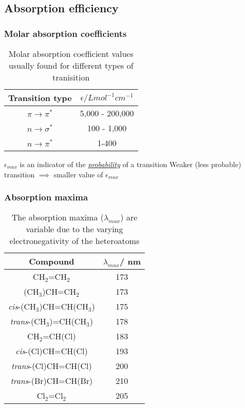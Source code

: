 \documentclass[ignorenonframetext]{beamer}
\begin{document}
\subsection{Absorption efficiency}

\begin{frame}[label=molabs]
\frametitle{Molar absorption coefficients}
\begin{table}[h!]
\caption{Molar absorption coefficient values usually found for different types of tranisition}
\begin{tabular}{c c}
	\textbf{Transition type} & \textbf{\(\epsilon/L mol^{-1}cm^{-1}\)}\\\hline
	\(\pi \rightarrow \pi^*\) & 5,000 - 200,000\\
	\(n \rightarrow \sigma^*\) & 100 - 1,000\\
	\(n \rightarrow \pi^*\) & 1-400\\\hline
\end{tabular}
\end{table}
\textbullet \(\epsilon_{max}\) is an indicator of the \emph{\underline{probability}} of a transition\newline\bigskip
\textbullet Weaker (less probable) transition \(\implies\) smaller value of \(\epsilon_{max}\)
\hyperlink{spontaneous<7>}{}
\end{frame}

\begin{frame}
\frametitle{Absorption maxima}
\begin{table}[h!]
\caption{The absorption maxima (\(\lambda_{max}\)) are variable due to the varying electronegativity of the heteroatoms}
\begin{tabular}{c c}
\textbf{Compound} 		&	\textbf{\(\lambda_{max}\)/ nm}\\\hline\rule{0pt}{1.2em}
CH\(_2\)=CH\(_2\)		&	173\\
(CH\(_3\))CH=CH\(_2\)	&	173\\
\textit{cis}-(CH\(_3\))CH=CH(CH\(_3\))	&	175\\
\textit{trans}-(CH\(_3\))=CH(CH\(_3\))	&	178\\
CH\(_2\)=CH(Cl)	&	183\\
\textit{cis}-(Cl)CH=CH(Cl)	&	193\\
\textit{trans}-(Cl)CH=CH(Cl)	&	200\\
\textit{trans}-(Br)CH=CH(Br)	&	210\\
Cl\(_2\)=Cl\(_2\)	&	205\\\hline
\end{tabular}
\end{table}
\end{frame}
\end{document}

